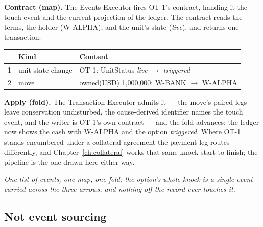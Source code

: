 \documentclass[11pt,a4paper]{article}
\begin{document}
\textbf{Contract (map).} The Events Executor fires OT-1's contract, handing it the touch
event and the current projection of the ledger. The contract reads the terms, the holder
(\mbox{W-ALPHA}), and the unit's state (\emph{live}), and
returns one transaction:

\begin{center}
\begin{tabular}{@{}rll@{}}
\toprule
 & Kind & Content \\
\midrule
1 & unit-state change & OT-1: UnitStatus \emph{live} $\to$ \emph{triggered} \\
2 & move & owned(USD) 1{,}000{,}000: W-BANK $\to$ W-ALPHA \\
\bottomrule
\end{tabular}
\end{center}

\textbf{Apply (fold).} The Transaction Executor admits it --- the move's paired legs leave
conservation undisturbed, the cause-derived identifier names the touch event, and the
writer is OT-1's own contract --- and the fold advances: the ledger now shows the cash with
\mbox{W-ALPHA} and the option \emph{triggered}. Where OT-1 stands encumbered under a
collateral agreement the payment leg routes differently, and Chapter~\ref{ch:collateral}
works that same knock start to finish; the pipeline is the one drawn here either way.

\emph{One list of events, one map, one fold: the option's whole knock is a single event
carried across the three arrows, and nothing off the record ever touches it.}

\subsection{Not event sourcing}
\end{document}
